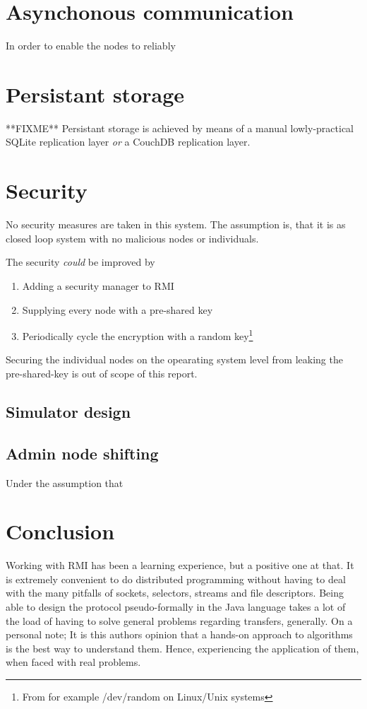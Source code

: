 \documentclass[10pt,a4paper]{article}
\begin{document}

\section{Asynchonous communication}
In order to enable the nodes to reliably 

\section{Persistant storage}
**FIXME** Persistant storage is achieved by means of a manual lowly-practical SQLite replication layer \emph{or} a CouchDB replication layer.

\section{Security}
No security measures are taken in this system. The assumption is, that it is as closed loop system with no malicious nodes or individuals.

The security \emph{could} be improved by 
\begin{enumerate}
\item Adding a security manager to RMI
\item Supplying every node with a pre-shared key
\item Periodically cycle the encryption with a random key\footnote{From for example /dev/random on Linux/Unix systems}
\end{enumerate}
Securing the individual nodes on the opearating system level from leaking the pre-shared-key is out of scope of this report.

\subsection{Simulator design}

\subsection{Admin node shifting}
Under the assumption that 

\section{Conclusion}
Working with RMI has been a learning experience, but a positive one at that. It is extremely convenient to do distributed programming without having to deal with the many pitfalls of sockets, selectors, streams and file descriptors. Being able to design the protocol pseudo-formally in the Java language takes a lot of the load of having to solve general problems regarding transfers, generally.
On a personal note; It is this authors opinion that a hands-on approach to algorithms is the best way to understand them. Hence, experiencing the application of them, when faced with real problems.
\end{document}
